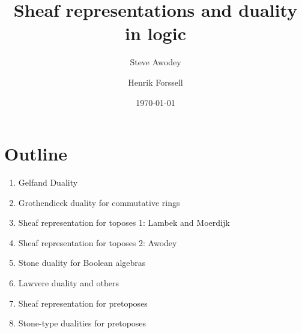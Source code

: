 \documentclass[11pt]{article}
\begin{document}

\title{
{Sheaf representations and duality in logic}
}
\author{Steve Awodey \and Henrik Forssell
}
\date{
\today}

\maketitle

\section{Outline}


\begin{enumerate}
\item Gelfand Duality

\item Grothendieck duality for commutative rings

\item Sheaf representation for toposes 1: Lambek and Moerdijk


\item Sheaf representation for toposes 2: Awodey

\item Stone duality for Boolean algebras

\item Lawvere duality and others

\item Sheaf representation for pretoposes

\item Stone-type dualities for pretoposes

\end{enumerate}



%






\end{document}
